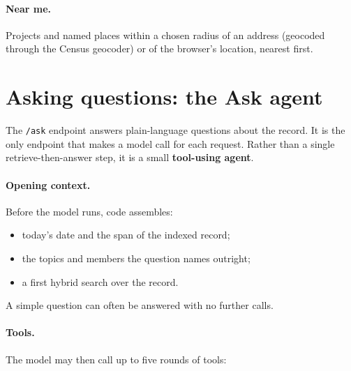\documentclass[11pt]{article}
\newcommand{\code}[1]{\texttt{#1}}
\begin{document}
\paragraph{Near me.} Projects and named places within a chosen radius of an address
(geocoded through the Census geocoder) or of the browser's location, nearest first.

\section{Asking questions: the Ask agent}

The \code{/ask} endpoint answers plain-language questions about the record. It is the only
endpoint that makes a model call for each request. Rather than a single
retrieve-then-answer step, it is a small \textbf{tool-using agent}.

\paragraph{Opening context.} Before the model runs, code assembles:
\begin{itemize}
  \item today's date and the span of the indexed record;
  \item the topics and members the question names outright;
  \item a first hybrid search over the record.
\end{itemize}
A simple question can often be answered with no further calls.

\paragraph{Tools.} The model may then call up to five rounds of tools:
\end{document}
